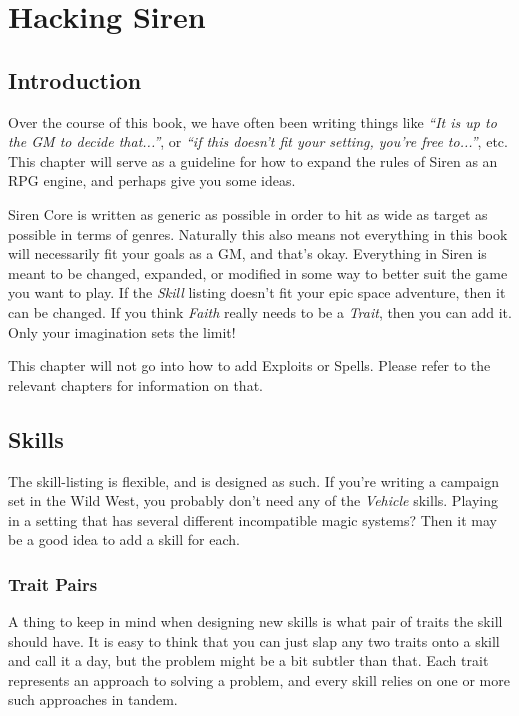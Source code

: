 \chapter{Hacking Siren}
\section{Introduction}
Over the course of this book, we have often been writing things like \textit{``It is up to the GM to decide that...''}, or \textit{``if this doesn't fit your setting, you're free to...''}, etc.
This chapter will serve as a guideline for how to expand the rules of Siren as an RPG engine, and perhaps give you some ideas.

Siren Core is written as generic as possible in order to hit as wide as target as possible in terms of genres.
Naturally this also means not everything in this book will necessarily fit your goals as a GM, and that's okay.
Everything in Siren is meant to be changed, expanded, or modified in some way to better suit the game you want to play.
If the \textit{Skill} listing doesn't fit your epic space adventure, then it can be changed.
If you think \textit{Faith} really needs to be a \textit{Trait}, then you can add it.
Only your imagination sets the limit!

\begin{note}
    This chapter will not go into how to add Exploits or Spells.
    Please refer to the relevant chapters for information on that.
\end{note}

\section{Skills}
The skill-listing is flexible, and is designed as such.
If you're writing a campaign set in the Wild West, you probably don't need any of the \textit{Vehicle} skills.
Playing in a setting that has several different incompatible magic systems? Then it may be a good idea to add a skill for each.

\subsection{Trait Pairs}
A thing to keep in mind when designing new skills is what pair of traits the skill should have.
It is easy to think that you can just slap any two traits onto a skill and call it a day, but the problem might be a bit subtler than that.
Each trait represents an approach to solving a problem, and every skill relies on one or more such approaches in tandem.

